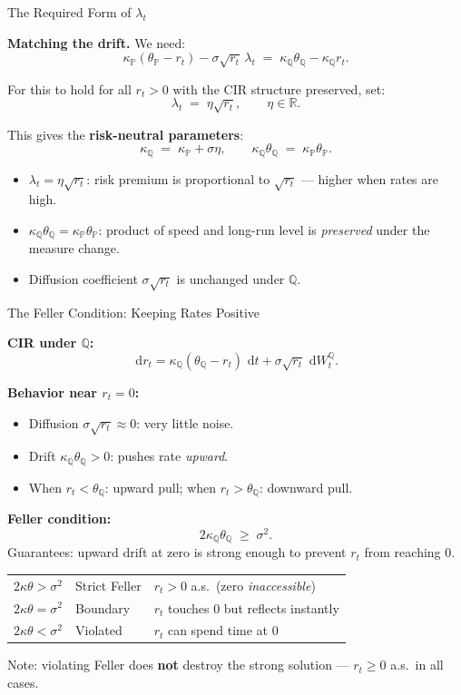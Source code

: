 \documentclass[compress]{beamer}
\newcommand{\PP}{\mathbb{P}}
\newcommand{\QQ}{\mathbb{Q}}
\newcommand{\dd}{\,\mathrm{d}}
\begin{document}
\begin{frame}{The Required Form of $\lambda_t$}

\textbf{Matching the drift.}  We need:
\[
	\kappa_\PP(\theta_\PP - r_t) - \sigma\sqrt{r_t}\,\lambda_t
	\;=\; \kappa_\QQ\theta_\QQ - \kappa_\QQ r_t.
\]

\medskip
For this to hold for all $r_t > 0$ with the CIR structure preserved, set:
\[
	\lambda_t \;=\; \eta\sqrt{r_t}, \qquad \eta \in \mathbb{R}.
\]

\medskip
This gives the \textbf{risk-neutral parameters}:
\[
	\boxed{
	\kappa_\QQ \;=\; \kappa_\PP + \sigma\eta,
	\qquad
	\kappa_\QQ\theta_\QQ \;=\; \kappa_\PP\theta_\PP.
	}
\]

\medskip
\begin{itemize}
	\item $\lambda_t = \eta\sqrt{r_t}$: risk premium is proportional to $\sqrt{r_t}$ — higher when rates are high.
	\item $\kappa_\QQ\theta_\QQ = \kappa_\PP\theta_\PP$: product of speed and long-run level is \textit{preserved} under the measure change.
	\item Diffusion coefficient $\sigma\sqrt{r_t}$ is unchanged under $\QQ$.
\end{itemize}

\end{frame}

\begin{frame}{The Feller Condition: Keeping Rates Positive}

\textbf{CIR under $\QQ$:}
\[
	\dd r_t = \kappa_\QQ(\theta_\QQ - r_t)\,\dd t + \sigma\sqrt{r_t}\,\dd W_t^\QQ.
\]

\medskip
\textbf{Behavior near $r_t = 0$:}
\begin{itemize}
	\item Diffusion $\sigma\sqrt{r_t} \approx 0$: very little noise.
	\item Drift $\kappa_\QQ\theta_\QQ > 0$: pushes rate \textit{upward}.
	\item When $r_t < \theta_\QQ$: upward pull; when $r_t > \theta_\QQ$: downward pull.
\end{itemize}

\medskip
\textbf{Feller condition:}
\[
	2\kappa_\QQ\theta_\QQ \;\ge\; \sigma^2.
\]
Guarantees: upward drift at zero is strong enough to prevent $r_t$ from reaching 0.

\medskip
\begin{tabular}{lll}
\toprule
$2\kappa\theta > \sigma^2$ & Strict Feller & $r_t > 0$ a.s.\ (zero \textit{inaccessible}) \\
$2\kappa\theta = \sigma^2$ & Boundary & $r_t$ touches 0 but reflects instantly \\
$2\kappa\theta < \sigma^2$ & Violated & $r_t$ can spend time at 0 \\
\bottomrule
\end{tabular}

\medskip
\small Note: violating Feller does \textbf{not} destroy the strong solution — $r_t \ge 0$ a.s.\ in all cases.

\end{frame}
\end{document}
